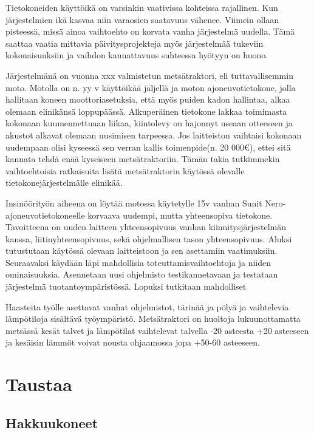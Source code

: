 \documentclass[]{article}
\newcommand{\euro}{€}
\begin{document}
Tietokoneiden käyttöikä on varsinkin vaativissa kohteissa rajallinen.
Kun järjestelmien ikä kasvaa niin varaosien saatavuus vähenee. Viimein
ollaan pisteessä, missä ainoa vaihtoehto on korvata vanha järjestelmä
uudella. Tämä saattaa vaatia mittavia päivitysprojekteja myös
järjestelmää tukeviin kokonaisuuksiin ja vaihdon kannattavuus suhteessa
hyötyyn on huono.

Järjestelmänä on vuonna xxx valmistetun metsätraktori, eli
tuttavallisemmin moto. Motolla on n. yy v käyttöikää jäljellä ja moton
ajoneuvotietokone, jolla hallitaan koneen moottoriasetuksia, että myös
puiden kadon hallintaa, alkaa olemaan elinikänsä loppupäässä.
Alkuperäinen tietokone lakkaa toimimasta kokonaan kuumennettuaan liikaa,
kiintolevy on hajonnyt useaan otteeseen ja akustot alkavat olemaan
uusimisen tarpeessa. Jos laitteiston vaihtaisi kokonaan uudempaan olisi
kyseessä sen verran kallis toimenpide(n. 20 000\euro{}), ettei sitä
kannata tehdä enää kyseiseen metsätraktoriin. Tämän takia tutkimmekin
vaihtoehtoisia ratkaisuita lisätä metsätraktorin käytössä olevalle
tietokonejärjestelmälle elinikää.

Insinöörityön aiheena on löytää motossa käytetylle 15v vanhan Sunit
Nero-ajoneuvotietokoneelle korvaava uudempi, mutta yhteensopiva
tietokone. Tavoitteena on uuden laitteen yhteensopivuus vanhan
kiinnitysjärjestelmän kanssa, liitinyhteensopivuus, sekä ohjelmallisen
tason yhteensopivuus. Aluksi tutustutaan käytössä olevaan laitteistoon
ja sen asettamiin vaatimuksiin. Seuraavaksi käydään läpi mahdollisia
toteuttamisvaihtoehtoja ja niiden ominaisuuksia. Asennetaan uusi
ohjelmisto testikannetavaan ja testataan järjestelmä
tuotantoympäristössä. Lopuksi tutkitaan mahdolliset

Haasteita työlle asettavat vanhat ohjelmistot, tärinää ja pölyä ja
vaihtelevia lämpötiloja sisältävä työympäristö. Metsätraktori on
huoltoja lukuunottamatta metsässä kesät talvet ja lämpötilat vaihtelevat
talvella -20 asteesta +20 asteeseen ja kesäisin lämmöt voivat nousta
ohjaamossa jopa +50-60 asteeseen.

\chapter{Taustaa}\label{taustaa}

\section{Hakkuukoneet}\label{hakkuukoneet}
\end{document}
